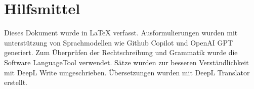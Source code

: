 
\section*{Hilfsmittel}
Dieses Dokument wurde in \LaTeX{} verfasst. Ausformulierungen wurden mit unterstützung von Sprachmodellen wie Github Copilot und OpenAI GPT generiert. Zum Überprüfen der Rechtschreibung und Grammatik wurde die Software LanguageTool verwendet. Sätze wurden zur besseren Verständlichkeit mit DeepL Write umgeschrieben.
Übersetzungen wurden mit DeepL Translator erstellt.